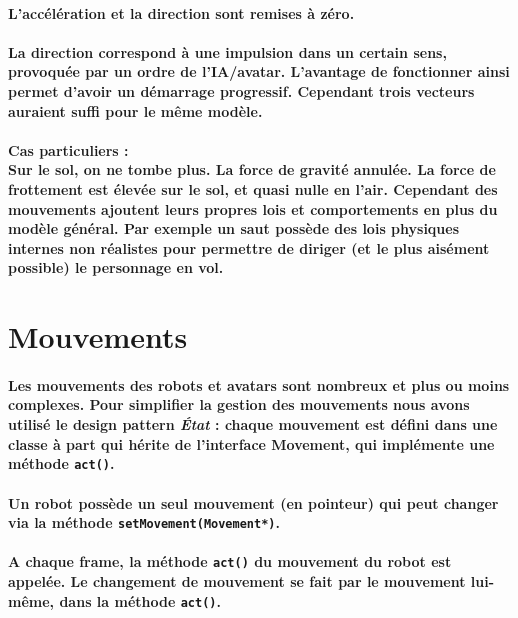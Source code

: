 \paragraph{L'accélération et la direction sont remises à zéro.}

\paragraph{La direction correspond à une impulsion dans un certain sens, provoquée par un ordre de l'IA/avatar. L'avantage de fonctionner ainsi permet d'avoir un démarrage progressif. Cependant trois vecteurs auraient suffi pour le même modèle.}

\paragraph{Cas particuliers : \\
 Sur le sol, on ne tombe plus. La force de gravité annulée. La force de frottement est élevée sur le sol, et quasi nulle en l'air. Cependant des mouvements ajoutent leurs propres lois et comportements en plus du modèle général. Par exemple un saut possède des lois physiques internes non réalistes pour permettre de diriger (et le plus aisément possible) le personnage en vol.}
 
 
 
\section{Mouvements}
\paragraph{Les mouvements des robots et avatars sont nombreux et plus ou moins complexes. Pour simplifier la gestion des mouvements nous avons utilisé le design pattern \textit{État} : chaque mouvement est défini dans une classe à part qui hérite de l'interface Movement, qui implémente une méthode \verb?act()?.}
\paragraph{Un robot possède un seul mouvement (en pointeur) qui peut changer via la méthode \verb?setMovement(Movement*)?.}
\paragraph{A chaque frame, la méthode \verb?act()? du mouvement du robot est appelée. Le changement de mouvement se fait par le mouvement lui-même, dans la méthode \verb?act()?.}

